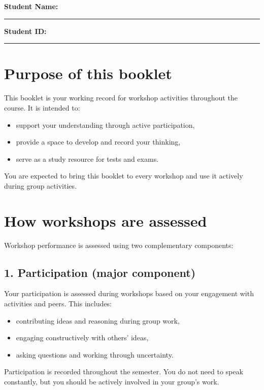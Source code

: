 
\workshopstart

\bigskip

\noindent\textbf{Student Name:} \rule{0.45\textwidth}{0.4pt}
\hfill
\textbf{Student ID:} \rule{0.2\textwidth}{0.4pt}

\bigskip

\clearpage

\section*{Purpose of this booklet}
This booklet is your working record for workshop activities throughout the course. It is intended to:
\begin{itemize}
    \item support your understanding through active participation,
    \item provide a space to develop and record your thinking,
    \item serve as a study resource for tests and exams.
\end{itemize}

You are expected to bring this booklet to every workshop and use it actively during group activities.


\section*{How workshops are assessed}
Workshop performance is assessed using two complementary components:

\subsection*{1. Participation (major component)}
Your participation is assessed during workshops based on your engagement with activities and peers. This includes:
\begin{itemize}
    \item contributing ideas and reasoning during group work,
    \item engaging constructively with others' ideas,
    \item asking questions and working through uncertainty.
\end{itemize}

Participation is recorded throughout the semester. You do not need to speak constantly, but you should be actively involved in your group's work.

